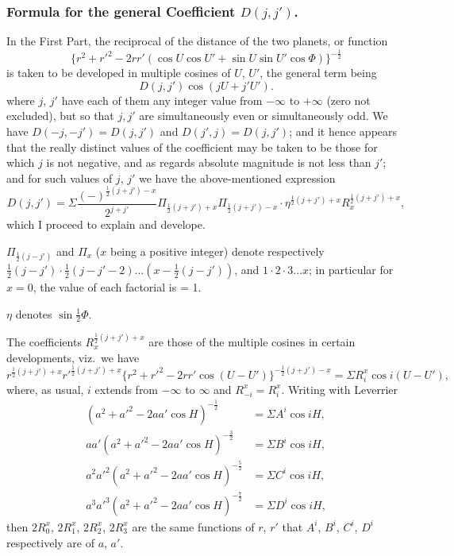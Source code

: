 \documentclass[11pt,a4paper]{article}
\begin{document}
\subsubsection*{Formula for the general Coefficient $D(j, j')$.}

In the First Part, the reciprocal of the distance of the two planets, or function
\[
\{r^{2} + r'^{2} - 2rr'(\cos U \cos U' + \sin U \sin U' \cos \Phi)\}^{-\frac{1}{2}}
\]
is taken to be developed in multiple cosines of $U$, $U'$, the general term being
\[
D(j, j') \cos(jU + j'U').
\]
where $j$, $j'$ have each of them any integer value from $-\infty$ to $+\infty$ (zero not excluded), but so that $j, j'$ are simultaneously even or simultaneously odd. We have $D(-j, -j') = D(j, j')$ and $D(j', j) = D(j, j')$; and it hence appears that the really distinct values of the coefficient may be taken to be those for which $j$ is not negative, and as regards absolute magnitude is not less than $j'$; and for such values of $j$, $j'$ we have the above-mentioned expression
\[
D(j, j') = \Sigma \frac{(-)^{\frac{1}{2}(j+j')-x}}{2^{j+j'}} \Pi_{\frac{1}{2}(j+j')+x} \Pi_{\frac{1}{2}(j+j')-x} \cdot \eta^{\frac{1}{2}(j+j')+x} R_{x}^{\frac{1}{2}(j+j')+x},
\]
which I proceed to explain and develope.

$\Pi_{\frac{1}{2}(j-j')}$ and $\Pi_{x}$ ($x$ being a positive integer) denote respectively $\tfrac{1}{2}(j-j') \cdot \tfrac{1}{2}(j-j'-2) \ldots (x - \tfrac{1}{2}(j-j'))$, and $1 \cdot 2 \cdot 3 \ldots x$; in particular for $x = 0$, the value of each factorial is = 1.

$\eta$ denotes $\sin \tfrac{1}{2}\Phi$.

The coefficients $R_{x}^{\frac{1}{2}(j+j')+x}$ are those of the multiple cosines in certain developments, viz.\ we have
\[
r^{\frac{1}{2}(j+j')+x} r'^{\frac{1}{2}(j+j')+x} \{r^{2} + r'^{2} - 2rr' \cos(U - U')\}^{-\frac{1}{2}(j+j')-x} = \Sigma R_{i}^{x} \cos i(U - U'),
\]
where, as usual, $i$ extends from $-\infty$ to $\infty$ and $R_{-i}^{x} = R_{i}^{x}$. Writing with Leverrier
\begin{align*}
(a^{2} + a'^{2} - 2aa' \cos H)^{-\frac{1}{2}} &= \Sigma A^{i} \cos iH, \\
aa'(a^{2} + a'^{2} - 2aa' \cos H)^{-\frac{3}{2}} &= \Sigma B^{i} \cos iH, \\
a^{2}a'^{2}(a^{2} + a'^{2} - 2aa' \cos H)^{-\frac{5}{2}} &= \Sigma C^{i} \cos iH, \\
a^{3}a'^{3}(a^{2} + a'^{2} - 2aa' \cos H)^{-\frac{7}{2}} &= \Sigma D^{i} \cos iH,
\end{align*}
then $2R_{0}^{x}$, $2R_{1}^{x}$, $2R_{2}^{x}$, $2R_{3}^{x}$ are the same functions of $r$, $r'$ that $A^{i}$, $B^{i}$, $C^{i}$, $D^{i}$ respectively are of $a$, $a'$.
\end{document}
